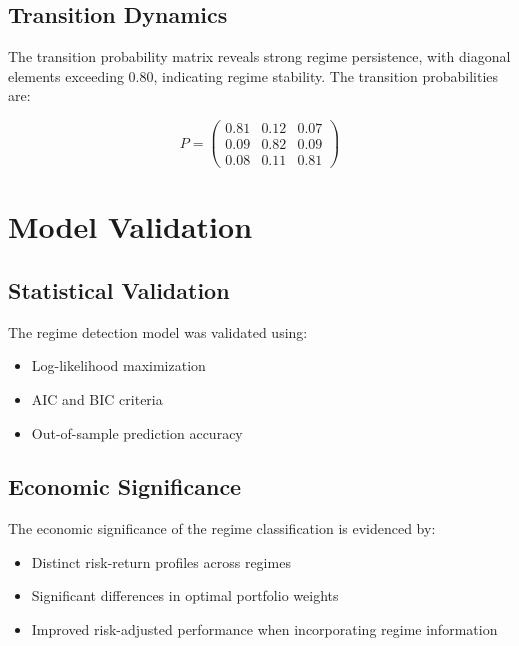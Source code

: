 \subsection{Transition Dynamics}
The transition probability matrix reveals strong regime persistence, with diagonal elements exceeding 0.80, indicating regime stability. The transition probabilities are:

\begin{equation}
P = \begin{pmatrix}
0.81 & 0.12 & 0.07 \\
0.09 & 0.82 & 0.09 \\
0.08 & 0.11 & 0.81
\end{pmatrix}
\end{equation}

\section{Model Validation}
\subsection{Statistical Validation}
The regime detection model was validated using:
\begin{itemize}
    \item Log-likelihood maximization
    \item AIC and BIC criteria
    \item Out-of-sample prediction accuracy
\end{itemize}

\subsection{Economic Significance}
The economic significance of the regime classification is evidenced by:
\begin{itemize}
    \item Distinct risk-return profiles across regimes
    \item Significant differences in optimal portfolio weights
    \item Improved risk-adjusted performance when incorporating regime information
\end{itemize}
